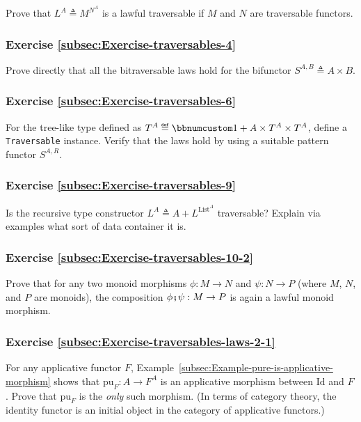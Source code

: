 Prove that $L^{A}\triangleq M^{N^{A}}$ is a lawful traversable if
$M$ and $N$ are traversable functors.

\subsubsection{Exercise \label{subsec:Exercise-traversables-4}\ref{subsec:Exercise-traversables-4}}

Prove directly that all the bitraversable laws hold for the bifunctor
$S^{A,B}\triangleq A\times B$.

\subsubsection{Exercise \label{subsec:Exercise-traversables-6}\ref{subsec:Exercise-traversables-6}}

For the tree-like type defined as $T^{A}\triangleq\bbnum 1+A\times T^{A}\times T^{A}$,
define a \lstinline!Traversable! instance. Verify that the laws hold
by using a suitable pattern functor $S^{A,R}$.

\subsubsection{Exercise \label{subsec:Exercise-traversables-9}\ref{subsec:Exercise-traversables-9}}

Is the recursive type constructor $L^{A}\triangleq A+L^{\text{List}^{A}}$
traversable? Explain via examples what sort of data container it is.

\subsubsection{Exercise \label{subsec:Exercise-traversables-10-2}\ref{subsec:Exercise-traversables-10-2}}

Prove that for any two monoid morphisms $\phi:M\rightarrow N$ and
$\psi:N\rightarrow P$ (where $M$, $N$, and $P$ are monoids), the
composition $\phi\bef\psi:M\rightarrow P$ is again a lawful monoid
morphism.

\subsubsection{Exercise \label{subsec:Exercise-traversables-laws-2-1}\ref{subsec:Exercise-traversables-laws-2-1}}

For any applicative functor $F$, Example~\ref{subsec:Example-pure-is-applicative-morphism}
shows that $\text{pu}_{F}:A\rightarrow F^{A}$ is an applicative morphism
between $\text{Id}$ and $F$. Prove that $\text{pu}_{F}$ is the
\emph{only} such morphism. (In terms of category theory, the identity
functor is an initial object in the category of applicative functors.)

